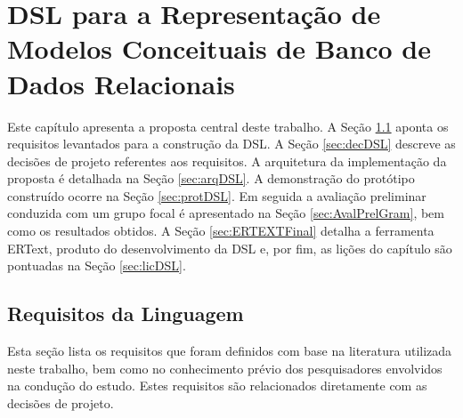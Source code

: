 \chapter{DSL para a Representação de Modelos Conceituais de Banco de Dados Relacionais}\label{propostaDSL}
\addlinespace
Este capítulo apresenta a proposta central deste trabalho. 
A Seção \ref{sec:reqDSL} aponta os requisitos levantados para a construção da \ac{DSL}. 
A Seção \ref{sec:decDSL} descreve as decisões de projeto referentes aos requisitos. 
A arquitetura da implementação da proposta é detalhada na Seção \ref{sec:arqDSL}. 
A demonstração do protótipo construído ocorre na Seção \ref{sec:protDSL}.
Em seguida a avaliação preliminar conduzida com um grupo focal é apresentado na Seção \ref{sec:AvalPrelGram}, bem como os resultados obtidos.
A Seção \ref{sec:ERTEXTFinal} detalha a ferramenta ERText, produto do desenvolvimento da \ac{DSL} e, por fim, as lições do capítulo são pontuadas na Seção \ref{sec:licDSL}.

\section{Requisitos da Linguagem} \label{sec:reqDSL}

Esta seção lista os requisitos que foram definidos com base na literatura utilizada neste trabalho, bem como no conhecimento prévio dos pesquisadores envolvidos na condução do estudo. 
Estes requisitos são relacionados diretamente com as decisões de projeto.

